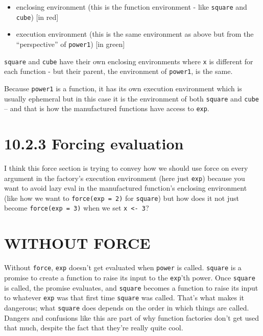 \documentclass[]{book}
\providecommand{\tightlist}{%
  \setlength{\itemsep}{0pt}\setlength{\parskip}{0pt}}
\begin{document}
\begin{itemize}
\tightlist
\item
  enclosing environment (this is the function environment - like \texttt{square} and \texttt{cube}) {[}in red{]}
\item
  execution environment (this is the same environment as above but from the ``perspective'' of \texttt{power1}) {[}in green{]}
\end{itemize}

\texttt{square} and \texttt{cube} have their own enclosing environments where \texttt{x} is different for each function - but their parent, the environment of \texttt{power1}, is the same.

Because \texttt{power1} is a function, it has its own execution environment which is usually ephemeral but in this case it is the environment of both \texttt{square} and \texttt{cube} -- and that is how the manufactured functions have access to \texttt{exp}.

\hypertarget{forcing-evaluation}{%
\section*{10.2.3 Forcing evaluation}\label{forcing-evaluation}}

I think this force section is trying to convey how we should use force on every argument in the factory's execution environment (here just \texttt{exp}) because you want to avoid lazy eval in the manufactured function's enclosing environment (like how we want to \texttt{force(exp\ =\ 2)} for \texttt{square}) but how does it not just become \texttt{force(exp\ =\ 3)} when we set \texttt{x\ \textless{}-\ 3}?

\hypertarget{without-force}{%
\section{WITHOUT FORCE}\label{without-force}}

Without \texttt{force}, \texttt{exp} doesn't get evaluated when \texttt{power} is called. \texttt{square} is a promise to create a function to raise its input to the \texttt{exp}'th power. Once \texttt{square} is called, the promise evaluates, and \texttt{square} becomes a function to raise its input to whatever \texttt{exp} was that first time \texttt{square} was called. That's what makes it dangerous; what \texttt{square} does depends on the order in which things are called. Dangers and confusions like this are part of why function factories don't get used that much, despite the fact that they're really quite cool.
\end{document}
